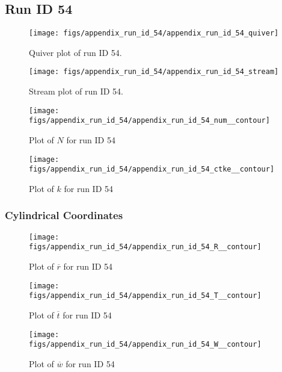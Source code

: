 \subsection{Run ID 54}
\begin{figure}[H]
\centering
\texttt{[image: figs/appendix\_run\_id\_54/appendix\_run\_id\_54\_quiver]}
\caption{Quiver plot of run ID 54.}
\label{fig:appendix_run_id_54_quiver}
\end{figure}


\begin{figure}[H]
\centering
\texttt{[image: figs/appendix\_run\_id\_54/appendix\_run\_id\_54\_stream]}
\caption{Stream plot of run ID 54.}
\label{fig:appendix_run_id_54_stream}
\end{figure}


\begin{figure}[H]
\centering
\texttt{[image: figs/appendix\_run\_id\_54/appendix\_run\_id\_54\_num\_\_contour]}
\caption{Plot of $N$ for run ID 54}
\label{fig:appendix_run_id_54_num__contour}
\end{figure}


\begin{figure}[H]
\centering
\texttt{[image: figs/appendix\_run\_id\_54/appendix\_run\_id\_54\_ctke\_\_contour]}
\caption{Plot of $k$ for run ID 54}
\label{fig:appendix_run_id_54_ctke__contour}
\end{figure}


\subsubsection{Cylindrical Coordinates}
\begin{figure}[H]
\centering
\texttt{[image: figs/appendix\_run\_id\_54/appendix\_run\_id\_54\_R\_\_contour]}
\caption{Plot of $\overline{r}$ for run ID 54}
\label{fig:appendix_run_id_54_R__contour}
\end{figure}


\begin{figure}[H]
\centering
\texttt{[image: figs/appendix\_run\_id\_54/appendix\_run\_id\_54\_T\_\_contour]}
\caption{Plot of $\overline{t}$ for run ID 54}
\label{fig:appendix_run_id_54_T__contour}
\end{figure}


\begin{figure}[H]
\centering
\texttt{[image: figs/appendix\_run\_id\_54/appendix\_run\_id\_54\_W\_\_contour]}
\caption{Plot of $\overline{w}$ for run ID 54}
\label{fig:appendix_run_id_54_W__contour}
\end{figure}


